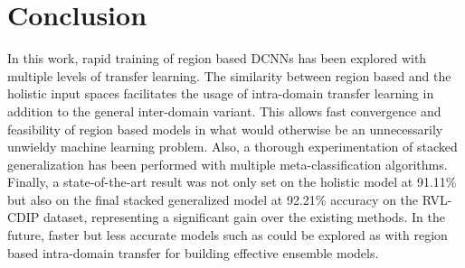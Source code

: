 \documentclass[10pt,conference,a4paper]{IEEEtran}
\begin{document}

\section{Conclusion}
In this work, rapid training of region based DCNNs has been explored with multiple levels of transfer learning. The similarity between region based and the holistic input spaces facilitates the usage of intra-domain transfer learning in addition to the general inter-domain variant. This allows fast convergence and feasibility of region based models in what would otherwise be an unnecessarily unwieldy machine learning problem. Also, a thorough experimentation of stacked generalization has been performed with multiple meta-classification algorithms. Finally, a state-of-the-art result was not only set on the holistic model at 91.11\% but also on the final stacked generalized model at 92.21\% accuracy on the RVL-CDIP dataset, representing a significant gain over the existing methods. In the future, faster but less accurate models such as \cite{afzal2017cutting} could be explored as with region based intra-domain transfer for building effective ensemble models.



\end{document}
